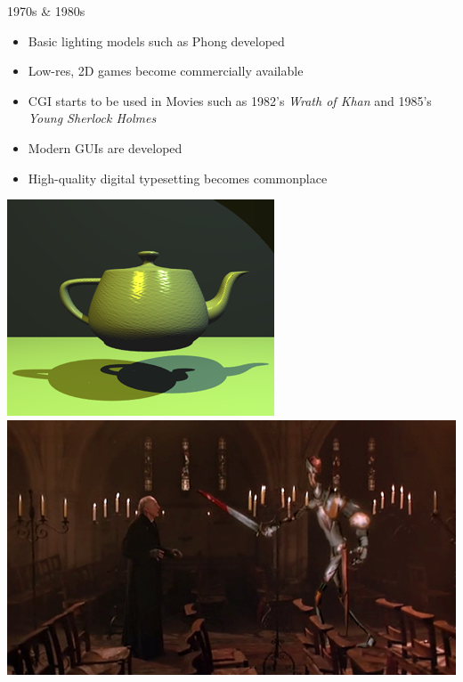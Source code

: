 \documentclass{lug}
\newcommand{\splitslide}[4]{
    \noindent
    \begin{minipage}{#1 \textwidth - #2 }
        #3
    \end{minipage}%
    \hspace{ \dimexpr #2 * 2 \relax }%
    \begin{minipage}{\textwidth - #1 \textwidth - #2 }
        #4
    \end{minipage}
}
\begin{document}
\begin{frame}{1970s \& 1980s}
    \splitslide{0.65}{.7em}{
        \small
        \begin{itemize}
            \item Basic lighting models such as Phong developed
            \item Low-res, 2D games become commercially available
            \item CGI starts to be used in Movies such as 1982's \textit{Wrath of Khan} and 1985's \textit{Young Sherlock Holmes}
            \item Modern GUIs are developed
            \item High-quality digital typesetting becomes commonplace
        \end{itemize}
    }{
        \includegraphics[width=\textwidth]{graphics/teapot_70s} \\
        \includegraphics[width=\textwidth]{graphics/ysh_knight} \\
}
\end{frame}
\end{document}
